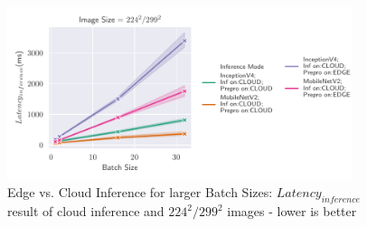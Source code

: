\begin{figure}[H]
\centering
\includegraphics[width=0.9\textwidth]{./Bilder/single_plots/batch_size_plots/Effects_of_Batch_size_Inference_Latencies_only_CLOUD_NR.pdf}
\caption{Edge vs.  Cloud Inference for larger Batch Sizes: $Latency_{inference}$ result of cloud inference and $224^2/299^2$ images - lower is better}
\label{fig:BatchSizeLatenciesCloud}
\end{figure}






